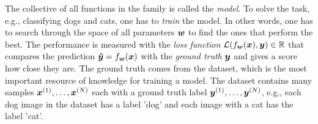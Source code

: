 		The collective of all functions in the family is called the \emph{model}.
		To solve the task, e.g., classifying dogs and cats, one has to \emph{train} the model.
		In other words, one has to search through the space of all parameters $\bm{w}$ to find the ones that perform the best.
		The performance is measured with the \emph{loss function} 
		$\mathcal{L}(f_{\bm{w}}(\bm{x}), \bm{y}) \in \mathbb{R}$ that compares the prediction 
		$\bm{\hat{y}} = f_{\bm{w}}(\bm{x})$ with the \emph{ground truth} $\bm{y}$ and gives a score how close they are.
		The ground truth comes from the dataset, which is the most important resource of knowledge for training a model.
		The dataset contains many samples $\bm{x}^{(1)}, \dots, \bm{x}^{(N)}$ each with a ground truth label 
		$\bm{y}^{(1)}, \dots, \bm{y}^{(N)}$, e.g., each dog image in the dataset has a label 'dog' and each image with a cat has the label 'cat'.
		
